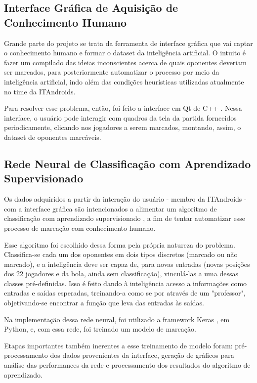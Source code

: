\documentclass[10pt,fleqn,a4paper]{article}
\begin{document}
    \subsection{Interface Gráfica de Aquisição de Conhecimento Humano}
    
    Grande parte do projeto se trata da ferramenta de interface gráfica que vai captar o conhecimento humano e formar o dataset da inteligência artificial. O intuito é fazer um compilado das ideias inconscientes acerca de quais oponentes deveriam ser marcados, para posteriormente automatizar o processo por meio da inteligência artificial, indo além das condições heurísticas utilizadas atualmente no time da ITAndroids. 
    
    Para resolver esse problema, então, foi feito a interface em Qt de C++ \citep{qtdoc}. Nessa interface, o usuário pode interagir com quadros da tela da partida fornecidos periodicamente, clicando nos jogadores a serem marcados, montando, assim, o dataset de oponentes marcáveis.
    
    \subsection{Rede Neural de Classificação com Aprendizado Supervisionado}
    
    Os dados adquiridos a partir da interação do usuário - membro da ITAndroids - com a interface gráfica são intencionados a alimentar um algoritmo de classificação com aprendizado supervisionado \citep{kotsiantis2007supervised}, a fim de tentar automatizar esse processo de marcação com conhecimento humano. 
    
    Esse algoritmo foi escolhido dessa forma pela própria natureza do problema. Classifica-se cada um dos oponentes em dois tipos discretos (marcado ou não marcado), e a inteligência deve ser capaz de, para novas entradas (novas posições dos 22 jogadores e da bola, ainda sem classificação), vinculá-las a uma dessas classes pré-definidas. Isso é feito dando à inteligência acesso a informações como entradas e saídas esperadas, treinando-a como se por através de um "professor", objetivando-se encontrar a função que leva das entradas às saídas.
    
    Na implementação dessa rede neural, foi utilizado a framework Keras \citep{gulli2017deep}, em Python, e, com essa rede, foi treinado um modelo de marcação.
    
    Etapas importantes também inerentes a esse treinamento de modelo foram: pré-processamento dos dados provenientes da interface, geração de gráficos para análise das performances da rede e processamento dos resultados do algoritmo de aprendizado.
\end{document}
